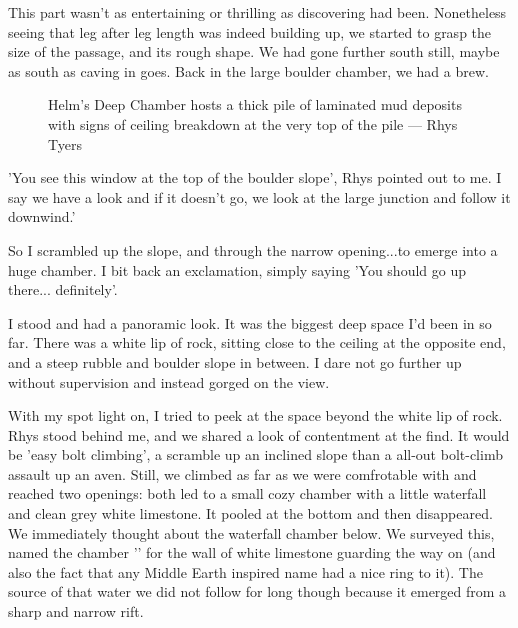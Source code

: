 This part wasn't as entertaining or thrilling as discovering had been. Nonetheless seeing that leg after leg length was indeed building up, we started to grasp the size of the passage, and its rough shape. We had gone further south still, maybe as south as caving in  goes. Back in the large boulder chamber, we had a brew.

\begin{figure}[t!]
\checkoddpage \ifoddpage \forcerectofloat \else \forceversofloat \fi
\centering
{}
\caption{Helm's Deep Chamber hosts a thick pile of laminated mud deposits with signs of ceiling breakdown at the very top of the pile --- Rhys Tyers}
\label{helmsdeeo}
\end{figure}

'You see this window at the top of the boulder slope', Rhys pointed out to me. I say we have a look and if it doesn't go, we look at the large junction and follow it downwind.' 

So I scrambled up the slope, and through the narrow opening...to emerge into a huge chamber. I bit back an exclamation, simply saying 'You should go up there... definitely'. 

I stood and had a panoramic look. It was the biggest deep space I'd been in so far. There was a white lip of rock, sitting close to the ceiling at the opposite end, and a steep rubble and boulder slope in between. I dare not go further up without supervision and instead gorged on the view. 

With my spot light on, I tried to peek at the space beyond the white lip of rock. Rhys stood behind me, and we shared a look of contentment at the find. It would be 'easy bolt climbing', a scramble up an inclined slope than a all-out bolt-climb assault up an aven. Still, we climbed as far as we were comfrotable with and reached two openings: both led to a small cozy chamber with a little waterfall and clean grey white limestone. It pooled at the bottom and then disappeared. We immediately thought about the waterfall chamber below. We surveyed this, named the chamber '' for the wall of white limestone guarding the way on (and also the fact that any Middle Earth inspired name had a nice ring to it). The source of that water we did not follow for long though because it emerged from a sharp and narrow rift. 

